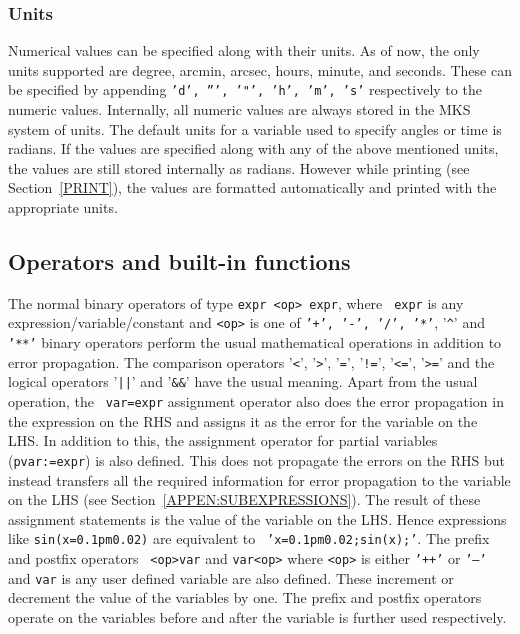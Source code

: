 \documentclass[12pt]{article}
\begin{document}
\subsubsection{Units}
\label{UNITS}
   
Numerical values can be specified along with their units.  As of now,
the only units supported are degree, arcmin, arcsec, hours, minute,
and seconds.  These can be specified by appending {\tt 'd', ''', '"',
'h', 'm', 's'} respectively to the numeric values.  Internally, all
numeric values are always stored in the MKS system of units.  The
default units for a variable used to specify angles or time is
radians.  If the values are specified along with any of the above
mentioned units, the values are still stored internally as radians.
However while printing (see Section~\ref{PRINT}), the values are
formatted automatically and printed with the appropriate units.

\subsection{Operators and built-in functions}

The normal binary operators of type {\tt expr <op> expr}, where {\tt
expr} is any expression/variable/constant and {\tt <op>} is one of
{\tt '+', '-', '/', '*'}, '{\texttt{\^}}' and {\tt '**'} binary
operators perform the usual mathematical operations in addition to
error propagation.  The comparison operators '{\texttt{<}}',
'{\texttt{>}}', '{\texttt{=}}', '{\texttt{!}}{\texttt{=}}',
'{\texttt{<}}{\texttt{=}}', '{\texttt{>}}{\texttt{=}}' and the logical
operators '{\texttt{|}}{\texttt{|}}' and '{\texttt{\&}}{\texttt{\&}}'
have the usual meaning.  Apart from the usual operation, the {\tt
var=expr} assignment operator also does the error propagation in the
expression on the RHS and assigns it as the error for the variable on
the LHS.  In addition to this, the assignment operator for partial
variables ({\tt pvar:=expr}) is also defined.  This does not propagate
the errors on the RHS but instead transfers all the required
information for error propagation to the variable on the LHS (see
Section~\ref{APPEN:SUBEXPRESSIONS}).  The result of these assignment
statements is the value of the variable on the LHS.  Hence expressions
like {\tt sin(x=0.1pm0.02)} are equivalent to {\tt
'x=0.1pm0.02;sin(x);'}.  The prefix and postfix operators {\tt
<op>var} and {\tt var<op>} where {\tt <op>} is either {\tt '++'} or
{\tt '--'} and {\tt var} is any user defined variable are also
defined.  These increment or decrement the value of the variables by
one.  The prefix and postfix operators operate on the variables before
and after the variable is further used respectively.
\end{document}
